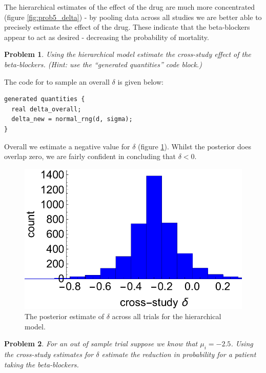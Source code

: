 \documentclass{article}
\newtheorem{problem}{Problem}[section]
\begin{document}
The hierarchical estimates of the effect of the drug are much more concentrated (figure \ref{fig:prob5_delta}) - by pooling data across all studies we are better able to precisely estimate the effect of the drug. These indicate that the beta-blockers appear to act as desired - decreasing the probability of mortality. 

\begin{problem}
	Using the hierarchical model estimate the cross-study effect of the beta-blockers. (Hint: use the ``generated quantities'' code block.)
\end{problem}

The code for to sample an overall $\delta$ is given below:
\begin{verbatim}
generated quantities {
  real delta_overall;
  delta_new = normal_rng(d, sigma);
}
\end{verbatim}

Overall we estimate a negative value for $\delta$ (figure \ref{fig:prob5_deltaOverall}). Whilst the posterior does overlap zero, we are fairly confident in concluding that $\delta<0$.

\begin{figure}[ht]
	\centerline{\includegraphics[width=1\textwidth]{figures/prob5_crossStudyDelta.pdf}}
	\caption{The posterior estimate of $\delta$  across all trials for the hierarchical model.}\label{fig:prob5_deltaOverall}
\end{figure}

\begin{problem}
	For an out of sample trial suppose we know that $\mu_i = -2.5$. Using the cross-study estimates for $\delta$ estimate the reduction in probability for a patient taking the beta-blockers.
\end{problem}
\end{document}
